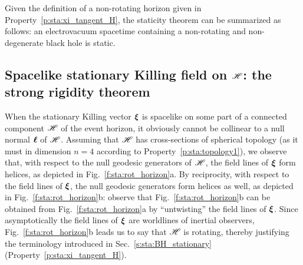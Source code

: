 \begin{remark}
Given the definition of a non-rotating horizon given in Property~\ref{p:sta:xi_tangent_H},
the staticity theorem can be summarized as follows:
an electrovacuum spacetime containing a non-rotating and non-degenerate black hole is static.
\end{remark}

\subsection{Spacelike stationary Killing field on $\mathscr{H}$: the strong rigidity theorem}
\label{s:sta:strong_rigidity}

When the stationary Killing vector $\bm{\xi}$ is spacelike
on some part of a connected component $\mathscr{H}$ of the event horizon, it obviously cannot be collinear to
a null normal $\bm{\ell}$ of $\mathscr{H}$.
Assuming that $\mathscr{H}$ has cross-sections of spherical topology (as it must
in dimension $n=4$ according to Property~\ref{p:sta:topology1}), we observe
that, with respect to the null geodesic generators of $\mathscr{H}$, the field lines of $\bm{\xi}$
form helices, as depicted in Fig.~\ref{f:sta:rot_horizon}a. By reciprocity,
with respect to the field lines of $\bm{\xi}$,
the null geodesic generators form helices as well, as depicted in
Fig.~\ref{f:sta:rot_horizon}b:
observe that Fig.~\ref{f:sta:rot_horizon}b can be obtained from Fig.~\ref{f:sta:rot_horizon}a
by ``untwisting'' the field lines of $\bm{\xi}$.
Since asymptotically the field lines of $\bm{\xi}$ are worldlines of inertial observers,
Fig.~\ref{f:sta:rot_horizon}b leads us to say
that $\mathscr{H}$ is rotating, thereby justifying the terminology introduced
in Sec.~\ref{s:sta:BH_stationary} (Property~\ref{p:sta:xi_tangent_H}).


